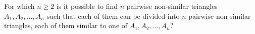 For which $n\ge 2$ is it possible to find $n$ pairwise non-similar triangles $A_1, A_2,\ldots , A_n$ such that each of them can be divided into $n$ pairwise non-similar triangles, each of them similar to one of $A_1,A_2 ,\ldots ,A_n$?